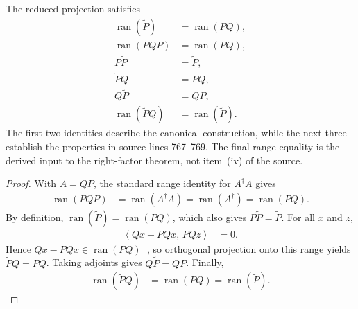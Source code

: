 \begin{lemma}
    \label{thm:mpu_two_projection_reduced_projection}
    \leanok
    The reduced projection satisfies
    \begin{align}
        \operatorname{ran}(\widetilde P)   & =\operatorname{ran}(PQ),           \\
        \operatorname{ran}(PQP)            & =\operatorname{ran}(PQ),           \\
        P\widetilde P                      & =\widetilde P,                     \\
        \widetilde P Q                     & =PQ,                               \\
        Q\widetilde P                      & =QP,                               \\
        \operatorname{ran}(\widetilde P Q) & =\operatorname{ran}(\widetilde P).
    \end{align}
    The first two identities describe the canonical construction, while the next
    three establish the properties in source lines 767--769. The final range
    equality is the derived input to the right-factor theorem, not item~(iv) of
    the source.
\end{lemma}

\begin{proof}\leanok
    With $A=QP$, the standard range identity for $A^\dagger A$ gives
    \begin{align}
        \operatorname{ran}(PQP)
         & =\operatorname{ran}(A^\dagger A)
        =\operatorname{ran}(A^\dagger)
        =\operatorname{ran}(PQ).
    \end{align}
    By definition, $\operatorname{ran}(\widetilde P)=\operatorname{ran}(PQ)$,
    which also gives $P\widetilde P=\widetilde P$. For all $x$ and $z$,
    \begin{align}
        \left\langle Qx-PQx,\,PQz\right\rangle & =0.
    \end{align}
    Hence $Qx-PQx\in\operatorname{ran}(PQ)^\perp$, so orthogonal projection
    onto this range yields $\widetilde P Q=PQ$. Taking adjoints gives
    $Q\widetilde P=QP$. Finally,
    \begin{align}
        \operatorname{ran}(\widetilde P Q)
         & =\operatorname{ran}(PQ)
        =\operatorname{ran}(\widetilde P).
    \end{align}
\end{proof}

